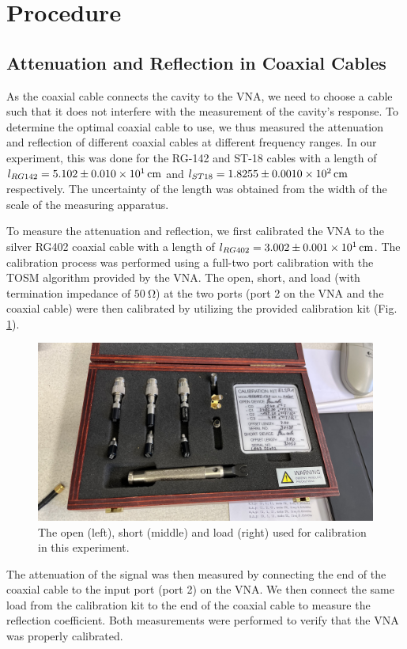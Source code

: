 \documentclass[a4paper]{report}
\numberwithin{equation}{section}
\begin{document}
\section{Procedure}

\subsection{Attenuation and Reflection in Coaxial Cables}

As the coaxial cable connects the cavity to the VNA, we need to choose a cable
such that it does not interfere with the measurement of the cavity's response.
To determine the optimal coaxial cable to use, we thus measured the attenuation
and reflection of different coaxial cables at different frequency ranges. In our
experiment, this was done for the RG-142 and ST-18 cables with a length of
$l_{RG142}=\SI{51.02 \pm 0.10}{\centi\meter}$ and $l_{ST18}=\SI{182.55 \pm
0.10}{\centi\meter}$ respectively. The uncertainty of the length was obtained
from the width of the scale of the measuring apparatus. \par 

To measure the attenuation and reflection, we first calibrated the VNA to the
silver RG402 coaxial cable with a length of $l_{RG402} = \SI{30.02 \pm
0.01}{\centi\meter}$. The calibration process was performed using a full-two
port calibration with the TOSM algorithm provided by the VNA. The open, short,
and load (with termination impedance of $\SI{50}{\ohm}$) at the two ports (port
2 on the VNA and the coaxial cable) were then calibrated by utilizing the
provided calibration kit (Fig. \ref{fig:calibration_kit}). 

\begin{figure}[hbt!]
	\centering
	\includegraphics[width=0.6\columnwidth]{calibration_kit.jpg}
	\caption{The open (left), short (middle) and load (right) used for
			calibration in this experiment.}

	\label{fig:calibration_kit}
\end{figure}

The attenuation of the signal was then measured by connecting the end of the
coaxial cable to the input port (port 2) on the VNA. We then connect the same
load from the calibration kit to the end of the coaxial cable to measure the
reflection coefficient. Both measurements were performed to verify that the VNA
was properly calibrated. \par 
\end{document}
